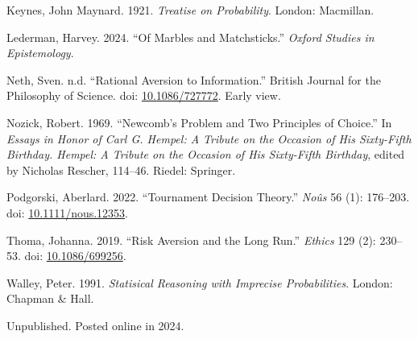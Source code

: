 \documentclass[
  10pt,
  letterpaper,
  DIV=11,
  numbers=noendperiod,
  twoside]{scrartcl}
\newlength{\cslhangindent}
\newenvironment{CSLReferences}[2] %
 {\begin{list}{}{%
  \setlength{\itemindent}{0pt}
  \setlength{\leftmargin}{0pt}
  \setlength{\parsep}{0pt}
  \ifodd #1
   \setlength{\leftmargin}{\cslhangindent}
   \setlength{\itemindent}{-1\cslhangindent}
  \fi
  \setlength{\itemsep}{#2\baselineskip}}}
 {\end{list}}
\begin{document}
\begin{CSLReferences}{1}{0}
Keynes, John Maynard. 1921. \emph{Treatise on Probability}. London:
Macmillan.

Lederman, Harvey. 2024. {``Of Marbles and Matchsticks.''} \emph{Oxford
Studies in Epistemology}.

Neth, Sven. n.d. {``Rational Aversion to Information.''} British Journal
for the Philosophy of Science. doi:
\href{https://doi.org/10.1086/727772}{10.1086/727772}. Early view.

Nozick, Robert. 1969. {``Newcomb's Problem and Two Principles of
Choice.''} In \emph{Essays in Honor of Carl {G}. Hempel: A Tribute on
the Occasion of His Sixty-Fifth Birthday. Hempel: A Tribute on the
Occasion of His Sixty-Fifth Birthday}, edited by Nicholas Rescher,
114--46. Riedel: Springer.

Podgorski, Aberlard. 2022. {``Tournament Decision Theory.''}
\emph{No{û}s} 56 (1): 176--203. doi:
\href{https://doi.org/10.1111/nous.12353}{10.1111/nous.12353}.

Thoma, Johanna. 2019. {``Risk Aversion and the Long Run.''}
\emph{Ethics} 129 (2): 230--53. doi:
\href{https://doi.org/10.1086/699256}{10.1086/699256}.

Walley, Peter. 1991. \emph{Statisical Reasoning with Imprecise
Probabilities}. London: Chapman \& Hall.

\end{CSLReferences}



\noindent Unpublished. Posted online in 2024.
\end{document}
